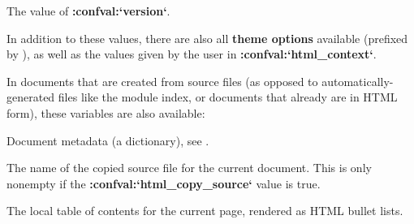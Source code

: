 \documentclass[letterpaper,10pt,english]{sphinxmanual}
\begin{document}
\begin{fulllineitems}
\label{templating:version}
The value of {\color{red}\bfseries{}:confval:{}`version{}`}.

\end{fulllineitems}


In addition to these values, there are also all \textbf{theme options} available
(prefixed by ), as well as the values given by the user in
{\color{red}\bfseries{}:confval:{}`html\_context{}`}.

In documents that are created from source files (as opposed to
automatically-generated files like the module index, or documents that already
are in HTML form), these variables are also available:

\begin{fulllineitems}
\label{templating:meta}
Document metadata (a dictionary), see {\hyperref[markup/misc:metadata]{}}.

\end{fulllineitems}


\begin{fulllineitems}
\label{templating:sourcename}
The name of the copied source file for the current document.  This is only
nonempty if the {\color{red}\bfseries{}:confval:{}`html\_copy\_source{}`} value is true.

\end{fulllineitems}


\begin{fulllineitems}
\label{templating:toc}
The local table of contents for the current page, rendered as HTML bullet
lists.

\end{fulllineitems}

\end{document}
